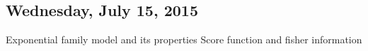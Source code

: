 \subsection{Wednesday, July 15, 2015}

Exponential family model and its properties
Score function and fisher information